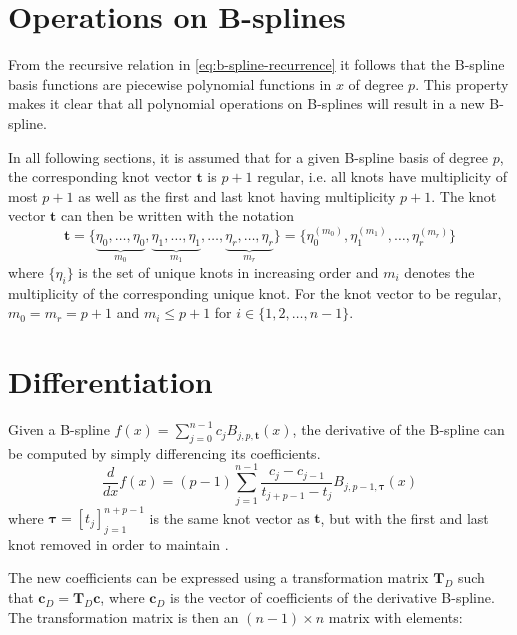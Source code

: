 \section{Operations on B-splines}
From the recursive relation in \cref{eq:b-spline-recurrence} it follows that the B-spline basis functions are piecewise polynomial functions in $x$ of degree $p$. This property makes it clear that all polynomial operations on B-splines will result in a new B-spline.

In all following sections, it is assumed that for a given B-spline basis of degree $p$, the corresponding knot vector $\mathbf t$ is $p+1$ regular, i.e. all knots have multiplicity of most $p+1$ as well as the first and last knot having multiplicity $p+1$. The knot vector $\mathbf t$ can then be written with the notation 
\begin{equation}\label{eq:regular-knot-vector}
    \mathbf t = \{\underbrace{\eta_0, \dots, \eta_0}_{m_0}, \underbrace{\eta_1, \dots, \eta_1}_{m_1}, \dots, \underbrace{\eta_{r}, \dots, \eta_{r}}_{m_r}\} = \{\eta_0^{(m_0)}, \eta_1^{(m_1)}, \dots, \eta_r^{(m_r)}\}
\end{equation}
where $\{\eta_i\}$ is the set of unique knots in increasing order and $m_i$ denotes the multiplicity of the corresponding unique knot. For the knot vector to be regular, $m_0 = m_r = p+1$ and $m_i \leq p+1$ for $i \in \{1,2,\ldots,n-1\}$.

\section{Differentiation}\label{sec:derivative}
Given a B-spline $f(x) = \sum_{j=0}^{n-1} c_j B_{j, p, \mathbf{t}}(x)$,
the derivative of the B-spline can be computed by simply differencing its coefficients. 
\begin{equation}\label{eq:b-spline-derivative}
    \frac{d}{dx} f(x) = (p-1) \sum_{j=1}^{n-1} \frac{c_j-c_{j-1}}{t_{j+p-1}-t_j} B_{j, p-1, \boldsymbol{\tau}}(x)
\end{equation}
where $\boldsymbol{\tau} = [t_j]_{j=1}^{n+p-1}$ is the same knot vector as $\mathbf{t}$, but with the first and last knot removed in order to maintain .

The new coefficients can be expressed using a transformation matrix $\mathbf T_D$ such that $\mathbf{c}_D = \mathbf T_D \mathbf{c}$, where $\mathbf{c}_D$ is the vector of coefficients of the derivative B-spline. The transformation matrix is then an $(n-1) \times n$ matrix with elements:

